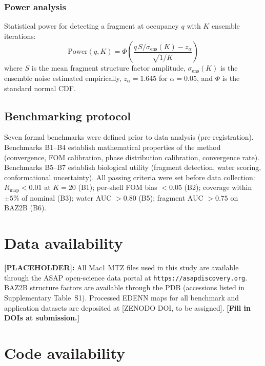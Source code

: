 \documentclass[10pt,twocolumn]{article}
\newcommand{\placeholder}[1]{%
  \begin{mdframed}[
    linecolor=placeholder,linewidth=1pt,
    backgroundcolor=red!5,
    innertopmargin=6pt,innerbottommargin=6pt,
    innerleftmargin=8pt,innerrightmargin=8pt]
  \small\color{placeholder}\textbf{[PLACEHOLDER]:} #1
  \end{mdframed}
}
\begin{document}
\subsubsection{Power analysis}

Statistical power for detecting a fragment at occupancy $q$ with
$K$ ensemble iterations:
\begin{equation}
  \mathrm{Power}(q,K) = \Phi\!\left(
    \frac{q\,S/\sigma_{\mathrm{ens}}(K) - z_\alpha}{\sqrt{1/K}}
  \right)
  \label{eq:power}
\end{equation}
where $S$ is the mean fragment structure factor amplitude,
$\sigma_{\mathrm{ens}}(K)$ is the ensemble noise estimated
empirically, $z_\alpha = 1.645$ for $\alpha = 0.05$, and $\Phi$
is the standard normal CDF.

\subsection{Benchmarking protocol}

Seven formal benchmarks were defined prior to data analysis
(pre-registration).  Benchmarks B1--B4 establish mathematical
properties of the method (convergence, FOM calibration, phase
distribution calibration, convergence rate).
Benchmarks B5--B7 establish biological utility (fragment detection,
water scoring, conformational uncertainty).
All passing criteria were set before data collection:
$R_{\mathrm{map}} < 0.01$ at $K=20$ (B1);
per-shell FOM bias $< 0.05$ (B2); coverage within $\pm 5$\%
of nominal (B3); water AUC $> 0.80$ (B5);
fragment AUC $> 0.75$ on BAZ2B (B6).

\section*{Data availability}

\placeholder{
All Mac1 MTZ files used in this study are available through the
ASAP open-science data portal at
\texttt{https://asapdiscovery.org}.
BAZ2B structure factors are available through the PDB
(accessions listed in Supplementary Table~S1).
Processed EDENN maps for all benchmark and application datasets
are deposited at [ZENODO DOI, to be assigned].
\textbf{[Fill in DOIs at submission.]}
}

\section*{Code availability}
\end{document}
